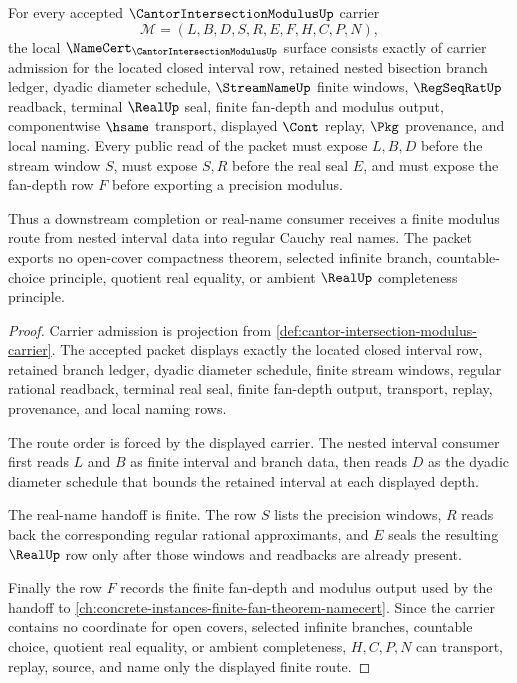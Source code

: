 
\begin{theorem}
\label{thm:cantor-intersection-modulus-namecert-obligations}
For every accepted $\CantorIntersectionModulusUp$ carrier
$$
\mathcal{M}=(L,B,D,S,R,E,F,H,C,P,N),
$$
the local $\NameCert_{\CantorIntersectionModulusUp}$ surface consists exactly of carrier admission for the located closed interval row, retained nested bisection branch ledger, dyadic diameter schedule, $\StreamNameUp$ finite windows, $\RegSeqRatUp$ readback, terminal $\RealUp$ seal, finite fan-depth and modulus output, componentwise $\hsame$ transport, displayed $\Cont$ replay, $\Pkg$ provenance, and local naming. Every public read of the packet must expose $L,B,D$ before the stream window $S$, must expose $S,R$ before the real seal $E$, and must expose the fan-depth row $F$ before exporting a precision modulus.

Thus a downstream completion or real-name consumer receives a finite modulus route from nested interval data into regular Cauchy real names. The packet exports no open-cover compactness theorem, selected infinite branch, countable-choice principle, quotient real equality, or ambient $\RealUp$ completeness principle.
\end{theorem}
\begin{proof}
Carrier admission is projection from \autoref{def:cantor-intersection-modulus-carrier}. The accepted packet displays exactly the located closed interval row, retained branch ledger, dyadic diameter schedule, finite stream windows, regular rational readback, terminal real seal, finite fan-depth output, transport, replay, provenance, and local naming rows.

The route order is forced by the displayed carrier. The nested interval consumer first reads $L$ and $B$ as finite interval and branch data, then reads $D$ as the dyadic diameter schedule that bounds the retained interval at each displayed depth.

The real-name handoff is finite. The row $S$ lists the precision windows, $R$ reads back the corresponding regular rational approximants, and $E$ seals the resulting $\RealUp$ row only after those windows and readbacks are already present.

Finally the row $F$ records the finite fan-depth and modulus output used by the handoff to \autoref{ch:concrete-instances-finite-fan-theorem-namecert}. Since the carrier contains no coordinate for open covers, selected infinite branches, countable choice, quotient real equality, or ambient completeness, $H,C,P,N$ can transport, replay, source, and name only the displayed finite route.
\end{proof}

